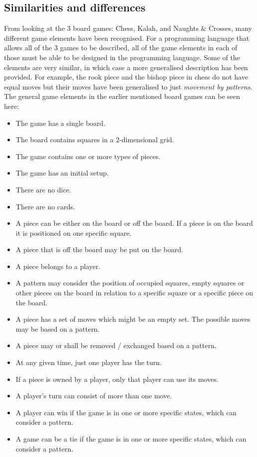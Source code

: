 \subsection{Similarities and differences}
\label{subsec:differences}
From looking at the 3 board games: Chess, Kalah, and Naughts \& Crosses, many different game elements have been recognised. For a programming language that allows all of the 3 games to be described, all of the game elements in each of those must be able to be designed in the programming language. Some of the elements are very similar, in which case a more generalised description has been provided. For example, the rook piece and the bishop piece in chess do not have equal moves but their moves have been generalised to just \textit{movement by patterns}. The general game elements in the earlier mentioned board games can be seen here:
\begin{itemize} [noitemsep]
  \item The game has a single board.
  \item The board contains squares in a 2-dimensional grid.
  \item The game contains one or more types of pieces.
  \item The game has an initial setup.
  \item There are no dice.
  \item There are no cards.
  \item A piece can be either on the board or off the board. If a piece is on the board it is positioned on one specific square.
  \item A piece that is off the board may be put on the board.
  \item A piece belongs to a player.
  \item A pattern may consider the position of occupied squares, empty squares or other pieces on the board in relation to a specific square or a specific piece on the board.
  \item A piece has a set of moves which might be an empty set. The possible moves may be based on a pattern.
  \item A piece may or shall be removed / exchanged based on a pattern.
  \item At any given time, just one player has the turn.
  \item If a piece is owned by a player, only that player can use its moves.
  \item A player's turn can consist of more than one move.
  \item A player can win if the game is in one or more specific states, which can consider a pattern.
  \item A game can be a tie if the game is in one or more specific states, which can consider a pattern.
\end{itemize}

